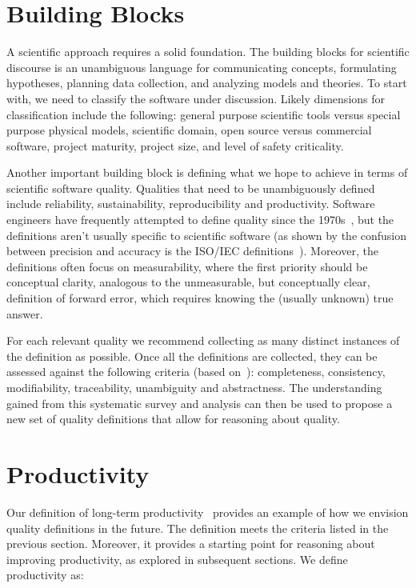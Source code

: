 \documentclass[sigconf, authorversion, nonacm]{acmart}
\begin{document}
\section{Building Blocks}

A scientific approach requires a solid foundation.  The building blocks for
scientific discourse is an unambiguous language for communicating concepts,
formulating hypotheses, planning data collection, and analyzing models and
theories.  To start with, we need to classify the software under discussion.
Likely dimensions for classification include the following: general purpose
scientific tools versus special purpose physical models, scientific domain, open
source versus commercial software, project maturity, project size, and level of
safety criticality.

Another important building block is defining what we hope to achieve in
terms of scientific software quality. Qualities that need to be unambiguously
defined include reliability, sustainability, reproducibility and productivity.
Software engineers have frequently attempted to define quality since the
1970s~\cite{McCallEtAl1977}, but the definitions aren't usually specific to
scientific software (as shown by the confusion between precision and accuracy is
the ISO/IEC definitions~\cite{ISO9126}). Moreover, the definitions often focus
on measurability, where the first priority should be conceptual clarity,
analogous to the unmeasurable, but conceptually clear, definition of forward
error, which requires knowing the (usually unknown) true answer.

For each relevant quality we recommend collecting as many distinct instances of
the definition as possible.  Once all the definitions are collected, they can be
assessed against the following criteria (based on~\citet{IEEE1998}):
completeness, consistency, modifiability, traceability, unambiguity and
abstractness. The understanding gained from this systematic survey and analysis
can then be used to propose a new set of quality definitions that allow for
reasoning about quality.

\section{Productivity}

Our definition of long-term productivity~\cite{SmithAndCarette2020arXiv}
provides an example of how we envision quality definitions in the future.  The
definition meets the criteria listed in the previous section.  Moreover, it
provides a starting point for reasoning about improving productivity, as
explored in subsequent sections.  We define productivity as:
\end{document}
